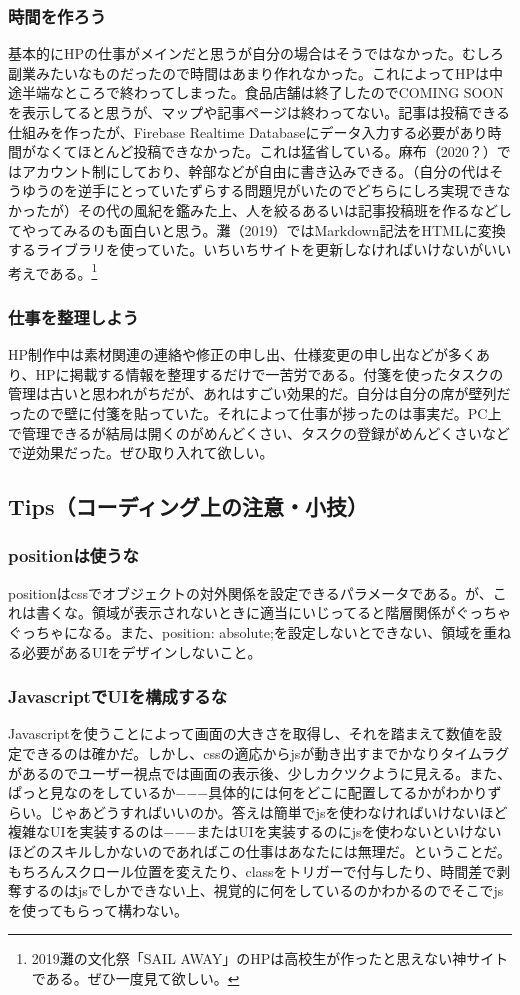 \documentclass[dvipdfmx,jb5]{jarticle}
\begin{document}
 \subsubsection{時間を作ろう}
 基本的にHPの仕事がメインだと思うが自分の場合はそうではなかった。むしろ副業みたいなものだったので時間はあまり作れなかった。これによってHPは中途半端なところで終わってしまった。食品店舗は終了したのでCOMING SOONを表示してると思うが、マップや記事ページは終わってない。記事は投稿できる仕組みを作ったが、Firebase Realtime Databaseにデータ入力する必要があり時間がなくてほとんど投稿できなかった。これは猛省している。麻布（2020？）ではアカウント制にしており、幹部などが自由に書き込みできる。（自分の代はそうゆうのを逆手にとっていたずらする問題児がいたのでどちらにしろ実現できなかったが）その代の風紀を鑑みた上、人を絞るあるいは記事投稿班を作るなどしてやってみるのも面白いと思う。灘（2019）ではMarkdown記法をHTMLに変換するライブラリを使っていた。いちいちサイトを更新しなければいけないがいい考えである。\footnote{2019灘の文化祭「SAIL AWAY」のHPは高校生が作ったと思えない神サイトである。ぜひ一度見て欲しい。}
 \subsubsection{仕事を整理しよう}
 HP制作中は素材関連の連絡や修正の申し出、仕様変更の申し出などが多くあり、HPに掲載する情報を整理するだけで一苦労である。付箋を使ったタスクの管理は古いと思われがちだが、あれはすごい効果的だ。自分は自分の席が壁列だったので壁に付箋を貼っていた。それによって仕事が捗ったのは事実だ。PC上で管理できるが結局は開くのがめんどくさい、タスクの登録がめんどくさいなどで逆効果だった。ぜひ取り入れて欲しい。
 \subsection{Tips（コーディング上の注意・小技）}
 \subsubsection{positionは使うな}
 positionはcssでオブジェクトの対外関係を設定できるパラメータである。が、これは書くな。領域が表示されないときに適当にいじってると階層関係がぐっちゃぐっちゃになる。また、position: absolute;を設定しないとできない、領域を重ねる必要があるUIをデザインしないこと。


 \subsubsection{JavascriptでUIを構成するな}
 Javascriptを使うことによって画面の大きさを取得し、それを踏まえて数値を設定できるのは確かだ。しかし、cssの適応からjsが動き出すまでかなりタイムラグがあるのでユーザー視点では画面の表示後、少しカクツクように見える。また、ぱっと見なのをしているか−−−具体的には何をどこに配置してるかがわかりずらい。じゃあどうすればいいのか。答えは簡単でjsを使わなければいけないほど複雑なUIを実装するのは−−−またはUIを実装するのにjsを使わないといけないほどのスキルしかないのであればこの仕事はあなたには無理だ。ということだ。もちろんスクロール位置を変えたり、classをトリガーで付与したり、時間差で剥奪するのはjsでしかできない上、視覚的に何をしているのかわかるのでそこでjsを使ってもらって構わない。
\end{document}
